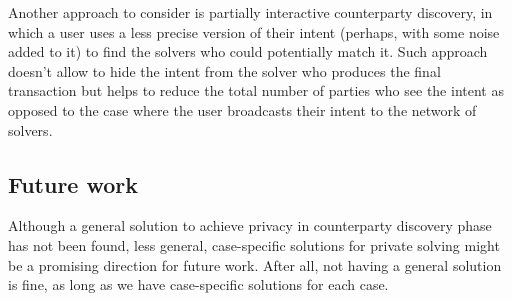 \documentclass[
    9pt,            %
    report,        %
    affiltop,       %
]{art}
\begin{document}
Another approach to consider is partially interactive counterparty discovery, in which a user uses a less precise version of their intent (perhaps, with some noise added to it) to find the solvers who could potentially match it. Such approach doesn't allow to hide the intent from the solver who produces the final transaction but helps to reduce the total number of parties who see the intent as opposed to the case where the user broadcasts their intent to the network of solvers.

\subsection{Future work}\label{future-work}

Although a general solution to achieve privacy in counterparty discovery phase has not been found, less general, case-specific solutions for private solving might be a promising direction for future work. After all, not having a general solution is fine, as long as we have case-specific solutions for each case.



\end{document}
